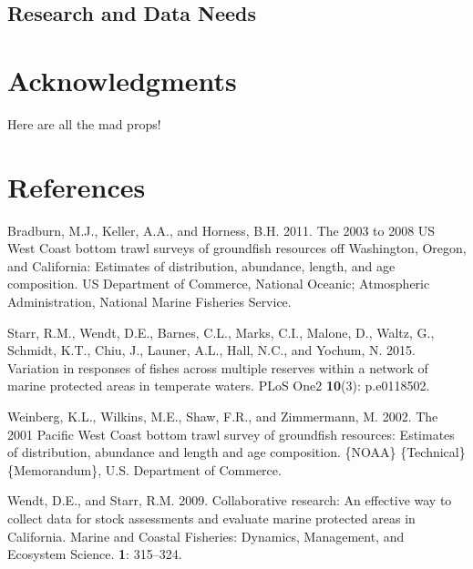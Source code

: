 \documentclass[11pt,
  english,
  letterpaper,
]{article}
\newlength{\cslhangindent}
\newenvironment{CSLReferences}[2] %
 {%
  \setlength{\parindent}{0pt}
  \ifodd #1 \everypar{\setlength{\hangindent}{\cslhangindent}}\ignorespaces\fi
  \ifnum #2 > 0
  \setlength{\parskip}{#2\baselineskip}
  \fi
 }%
 {}
\begin{document}
\hypertarget{research-and-data-needs-1}{%
\subsection{Research and Data Needs}\label{research-and-data-needs-1}}

\hypertarget{acknowledgments}{%
\section{Acknowledgments}\label{acknowledgments}}

Here are all the mad props!

\clearpage

\hypertarget{references}{%
\section{References}\label{references}}

\hypertarget{refs}{}
\begin{CSLReferences}{1}{0}
\leavevmode{}%
Bradburn, M.J., Keller, A.A., and Horness, B.H. 2011. The 2003 to 2008 {US} {West} {Coast} bottom trawl surveys of groundfish resources off {Washington}, {Oregon}, and {California}: Estimates of distribution, abundance, length, and age composition. US Department of Commerce, National Oceanic; Atmospheric Administration, National Marine Fisheries Service.

\leavevmode{}%
Starr, R.M., Wendt, D.E., Barnes, C.L., Marks, C.I., Malone, D., Waltz, G., Schmidt, K.T., Chiu, J., Launer, A.L., Hall, N.C., and Yochum, N. 2015. Variation in responses of fishes across multiple reserves within a network of marine protected areas in temperate waters. PLoS One2 \textbf{10}(3): p.e0118502.

\leavevmode{}%
Weinberg, K.L., Wilkins, M.E., Shaw, F.R., and Zimmermann, M. 2002. The 2001 {Pacific} {West} {Coast} bottom trawl survey of groundfish resources: Estimates of distribution, abundance and length and age composition. \{NOAA\} \{Technical\} \{Memorandum\}, U.S. Department of Commerce.

\leavevmode{}%
Wendt, D.E., and Starr, R.M. 2009. Collaborative research: An effective way to collect data for stock assessments and evaluate marine protected areas in {C}alifornia. Marine and Coastal Fisheries: Dynamics, Management, and Ecosystem Science. \textbf{1}: 315--324.

\end{CSLReferences}
\end{document}
